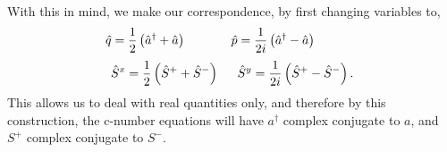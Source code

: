 \documentclass[aps,prl,twocolumn,
superscriptaddress,groupedaddress]{revtex4}
\begin{document}



With this in mind, we make our correspondence, by first changing
variables to,
\begin{equation}
\hspace{-0.5in} \hat{q} =
\frac{1}{2} \left( \hat{a}^{\dagger} + \hat{a} \right)
\hspace{0.5in} \hat{p} =
\frac{1}{2i} \left( \hat{a}^{\dagger} - \hat{a} \right)
\end{equation}
\begin{equation}
\hat{S}^x =
\frac{1}{2} \left( \hat{S}^{+} + \hat{S}^{-} \right)
\hspace{0.2in} \hat{S}^y =
\frac{1}{2i} \left( \hat{S}^{+} - \hat{S}^{-} \right).
\end{equation}
This allows us to deal with real quantities only, and therefore by this
construction, the c-number equations will have $a^{\dagger}$ complex
conjugate to $a$, and $S^+$  complex conjugate to $S^-$.
\end{document}
